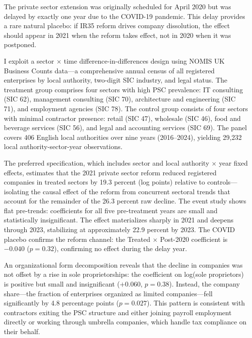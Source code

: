 \documentclass[12pt]{article}
\begin{document}
The private sector extension was originally scheduled for April 2020 but was delayed by exactly one year due to the COVID-19 pandemic. This delay provides a rare natural placebo: if IR35 reform drives company dissolution, the effect should appear in 2021 when the reform takes effect, not in 2020 when it was postponed.

I exploit a sector $\times$ time difference-in-differences design using NOMIS UK Business Counts data---a comprehensive annual census of all registered enterprises by local authority, two-digit SIC industry, and legal status. The treatment group comprises four sectors with high PSC prevalence: IT consulting (SIC 62), management consulting (SIC 70), architecture and engineering (SIC 71), and employment agencies (SIC 78). The control group consists of four sectors with minimal contractor presence: retail (SIC 47), wholesale (SIC 46), food and beverage services (SIC 56), and legal and accounting services (SIC 69). The panel covers 406 English local authorities over nine years (2016--2024), yielding 29,232 local authority-sector-year observations.

The preferred specification, which includes sector and local authority $\times$ year fixed effects, estimates that the 2021 private sector reform reduced registered companies in treated sectors by 19.3 percent (log points) relative to controls---isolating the causal effect of the reform from concurrent sectoral trends that account for the remainder of the 26.3 percent raw decline. The event study shows flat pre-trends: coefficients for all five pre-treatment years are small and statistically insignificant. The effect materializes sharply in 2021 and deepens through 2023, stabilizing at approximately 22.9 percent by 2023. The COVID placebo confirms the reform channel: the Treated $\times$ Post-2020 coefficient is $-0.040$ ($p = 0.32$), confirming no effect during the delay year.

An organizational form decomposition reveals that the decline in companies was not offset by a rise in sole proprietorships: the coefficient on log(sole proprietors) is positive but small and insignificant ($+0.060$, $p = 0.38$). Instead, the company share---the fraction of enterprises organized as limited companies---fell significantly by 4.8 percentage points ($p = 0.027$). This pattern is consistent with contractors exiting the PSC structure and either joining payroll employment directly or working through umbrella companies, which handle tax compliance on their behalf.
\end{document}
